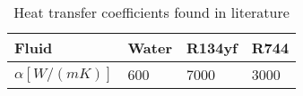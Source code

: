 \begin{table}[h!]
\centering
\caption{Heat transfer coefficients found in literature}\vspace{2mm}
\label{tab:alphas} 
\begin{tabular}{llll}
	\toprule
	Fluid             & Water & R134yf & R744 \\ \midrule
	$\alpha [W/(mK)]$ & 600   & 7000   & 3000 \\ \bottomrule
\end{tabular}
\end{table}